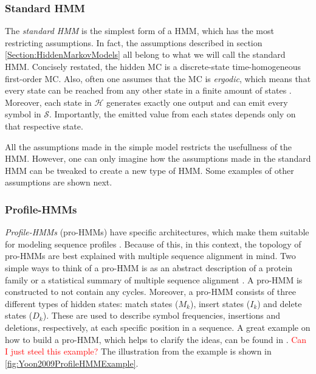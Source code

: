 \documentclass{article}
\begin{document}
\subsubsection{Standard HMM}
The \textit{standard HMM} is the simplest form of a HMM, which has the most restricting assumptions. In fact, the assumptions described in section \ref{Section:HiddenMarkovModels} all belong to what we will call the standard HMM. Concisely restated, the hidden MC is a discrete-state time-homogeneous first-order MC. Also, often one assumes that the MC is \textit{ergodic}, which means that every state can be reached from any other state in a finite amount of states \cite{Rabiner1989}. Moreover, each state in $\mathcal{H}$ generates exactly one output and can emit every symbol in $\mathcal{S}$. Importantly, the emitted value from each states depends only on that respective state. 

All the assumptions made in the simple model restricts the usefullness of the HMM. However, one can only imagine how the assumptions made in the standard HMM can be tweaked to create a new type of HMM. Some examples of other assumptions are shown next. 

\subsubsection{Profile-HMMs}
\textit{Profile-HMMs} (pro-HMMs) have specific architectures, which make them suitable for modeling sequence profiles \cite{Yoon2009}. Because of this, in this context, the topology of pro-HMMs are best explained with multiple sequence alignment in mind. Two simple ways to think of a pro-HMM is as an abstract description of a protein family or a statistical summary of multiple sequence alignment \cite{Christianini2006}. A pro-HMM is constructed to not contain any cycles. Moreover, a pro-HMM consists of three different types of hidden states: match states ($M_k$), insert states ($I_k$) and delete states ($D_k$). These are used to describe symbol frequencies, insertions and deletions, respectively, at each specific position in a sequence. A great example on how to build a pro-HMM, which helps to clarify the ideas, can be found in \cite{Yoon2009}. \textcolor{red}{Can I just steel this example?} The illustration from the example is shown in \ref{fig:Yoon2009ProfileHMMExample}.
\end{document}
